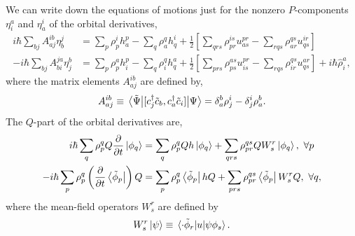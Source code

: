 We can write down the equations of motions just for the nonzero $P$-components
$\eta^a_i$ and $\eta^i_a$ of the orbital derivatives,
\begin{align}
    i\hbar \sum_{bj}A^{ib}_{aj}\eta^j_b 
        &= \sum_p \rho^i_p h^p_a - \sum_q \rho^q_a h^i_q
        + \frac{1}{2}\left[ 
              \sum_{qrs} \rho^{is}_{pr} u^{pr}_{as}
            - \sum_{rqs} \rho^{qs}_{ar} u^{ir}_{qs}     
        \right] \\
    - i\hbar \sum_{bj} A^{ja}_{bi}\eta^b_j 
        &= \sum_p \rho^a_p h^p_i - \sum_q \rho^q_i h^a_q
        + \frac{1}{2} \left[
              \sum_{prs} \rho^{as}_{ps} u^{pr}_{is}
            - \sum_{rqs} \rho^{qs}_{ir} u^{ar}_{qs}
        \right]
        + i\hbar \hat{\rho}_i^a,
\end{align}
where the matrix elements $A^{ib}_{aj}$ are defined by,
\begin{equation}
    A^{ib}_{aj} \equiv 
    \mel{\tilde{\Psi}}{[c^\dagger_j\tilde{c}_b, c^\dagger_a\tilde{c}_i]}{\Psi}
    = \delta^b_a\rho^i_j - \delta^i_j\rho^b_a.
\end{equation}
The $Q$-part of the orbital derivatives are,
\begin{align}
    i\hbar\sum_q \rho^q_p Q \frac{\partial}{\partial t} \ket{\phi_q}
        &= \sum_q \rho^q_p Q h\ket{\phi_q}
        + \sum_{qrs} \rho^{qs}_{pr}Q W^r_s\ket{\phi_q}, \ \forall p \\
    -i\hbar\sum_p \rho^q_p \left(\frac{\partial}{\partial t}\bra{\tilde{\phi}_p} \right)Q
        &= \sum_p\rho^q_p \bra{\tilde{\phi}_p}hQ
        + \sum_{prs} \rho^{qs}_{pr} \bra{\tilde{\phi}_p}W^r_s Q, \ \forall q,
\end{align}
where the mean-field operators $W^r_s$ are defined by 
\begin{equation}
    W^r_s\ket{\psi} \equiv 
    \mel*{\cdot \tilde{\phi}_r}{u}{\psi\phi_s}.
\end{equation}

